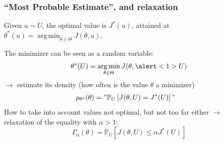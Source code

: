 \documentclass[11pt]{beamer}
\newcommand{\Prob}{\mathbb{P}}
\DeclareMathOperator*{\argmin}{arg\,min}
\newcommand{\kk}{\theta}
\newcommand{\uu}{u}
\newcommand{\UU}{U}
\newcommand{\Kspace}{\Theta}
\begin{document}
\begin{frame}
  \frametitle{``Most Probable Estimate'', and relaxation}%


  Given $\uu \sim \UU$, the optimal value is $J^*(\uu)$, attained at
  $\kk^*(\uu) = \argmin_{\kk\in\Kspace} J(\kk,\uu)$.
  \pause

  
      The minimizer can be seen as a random variable:
      \begin{equation*}
        \kk^*(\UU) = \argmin_{\kk\in\Kspace} J(\kk,\alert<1>{\UU})
      \end{equation*}
      $\longrightarrow$ estimate its density (how often is the value $\kk$ a minimizer)
      \begin{align*}
        p_{\kk^*}(\kk)%
                                               &= "\Prob_{\UU}\left[J(\kk,\UU)= J^*(\UU) \right]"                                               %
      \end{align*}
      \pause
      How to take into account values not optimal, but not too far either
      $\longrightarrow$ relaxation of the equality with $\alpha> 1$:
      \begin{equation*}
        \Gamma_{\alpha}(\kk) = \Prob_{\UU}\left[J(\kk,\UU) \leq \alpha J^*(\UU) \right]
      \end{equation*}
\end{frame}
\end{document}

